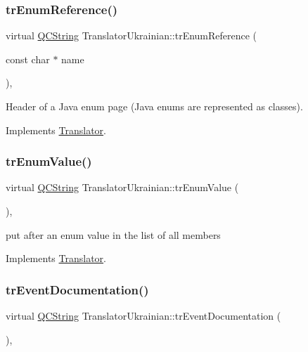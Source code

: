 \subsubsection{\texorpdfstring{trEnumReference()}{trEnumReference()}}
{\footnotesize\ttfamily virtual \mbox{\hyperlink{class_q_c_string}{Q\+C\+String}} Translator\+Ukrainian\+::tr\+Enum\+Reference (\begin{DoxyParamCaption}\item[{const char $\ast$}]{name }\end{DoxyParamCaption})\hspace{0.3cm}{\ttfamily [inline]}, {\ttfamily [virtual]}}

Header of a Java enum page (Java enums are represented as classes). 

Implements \mbox{\hyperlink{class_translator}{Translator}}.

\mbox{\label{class_translator_ukrainian_aecdeefecc693c82687814d7e2c7c5f44}} 
\subsubsection{\texorpdfstring{trEnumValue()}{trEnumValue()}}
{\footnotesize\ttfamily virtual \mbox{\hyperlink{class_q_c_string}{Q\+C\+String}} Translator\+Ukrainian\+::tr\+Enum\+Value (\begin{DoxyParamCaption}{ }\end{DoxyParamCaption})\hspace{0.3cm}{\ttfamily [inline]}, {\ttfamily [virtual]}}

put after an enum value in the list of all members 

Implements \mbox{\hyperlink{class_translator}{Translator}}.

\mbox{\label{class_translator_ukrainian_a2ee0cce934d80993b6eef09bf3ec0dc0}} 
\subsubsection{\texorpdfstring{trEventDocumentation()}{trEventDocumentation()}}
{\footnotesize\ttfamily virtual \mbox{\hyperlink{class_q_c_string}{Q\+C\+String}} Translator\+Ukrainian\+::tr\+Event\+Documentation (\begin{DoxyParamCaption}{ }\end{DoxyParamCaption})\hspace{0.3cm}{\ttfamily [inline]}, {\ttfamily [virtual]}}

